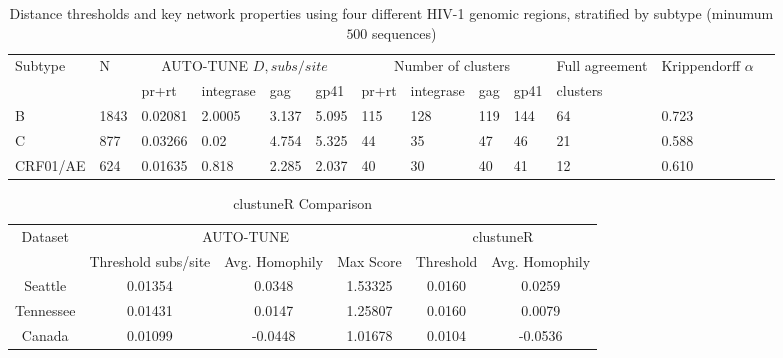 \documentclass[utf8]{FrontiersinHarvard} %
\begin{document}
\begin{table}[h!]
	\caption{Distance thresholds and key network properties using four different HIV-1 genomic regions, stratified by subtype (minumum $500$ sequences)}
	\label{tab:LANL:full}

	\vspace{10pt}
	\centering
	\begin{ssmall}
		\begin{tabular}{lllllllllllll}
			\hline
			Subtype  & N    & \multicolumn{4}{c}{AUTO-TUNE $D, subs/site$} & \multicolumn{4}{c}{Number of clusters} & Full agreement & Krippendorff $\alpha$                                                     \\
			         &      & pr+rt                                 & integrase                              & gag            & gp41                  & pr+rt & integrase & gag & gp41 & clusters &       \\
			\hline

			B        & 1843 & 0.02081                                 & 2.0005                                 & 3.137          & 5.095                 & 115   & 128       & 119 & 144  & 64       & 0.723
			\\ C & 877 & 0.03266 & 0.02 & 4.754 & 5.325 & 44 & 35 & 47 & 46 & 21 & 0.588 \\
			CRF01/AE & 624  & 0.01635                                 & 0.818                                  & 2.285          & 2.037                 & 40    & 30        & 40  & 41   & 12       & 0.610
			\\

			\hline
		\end{tabular}
	\end{ssmall}
\end{table}

\begin{table}[h!]
	\caption{clustuneR Comparison}
	\label{tab:homophily}
	\vspace{8pt}
	\centering
	\begin{tabular}{|c|c|c|c|c|c|}
		\hline
		Dataset   & \multicolumn{3}{c|}{AUTO-TUNE} & \multicolumn{2}{c|}{clustuneR}                                          \\
		\cline{2-6}
		          & Threshold subs/site                     & Avg. Homophily                 & Max Score & Threshold & Avg. Homophily \\
		\hline
		Seattle   & 0.01354                        & 0.0348                         & 1.53325   & 0.0160    & 0.0259         \\
		Tennessee & 0.01431                        & 0.0147                         & 1.25807   & 0.0160    & 0.0079         \\
		Canada    & 0.01099                        & -0.0448                        & 1.01678   & 0.0104    & -0.0536        \\
		\hline
	\end{tabular}
\end{table}
\end{document}
